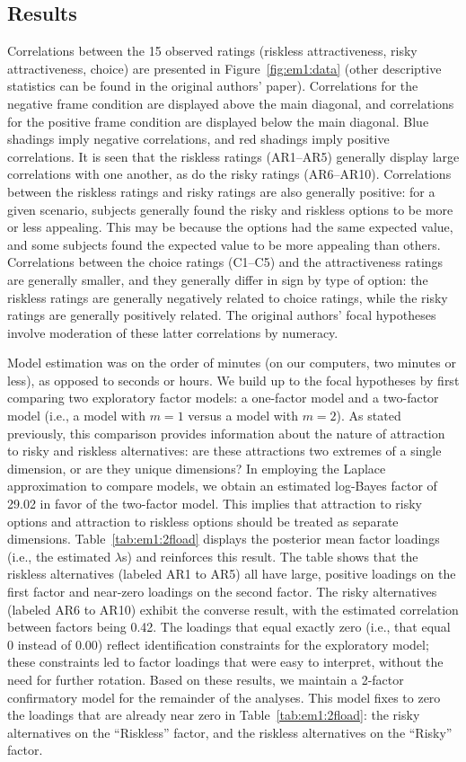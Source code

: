 \subsection{Results}
Correlations between the 15 observed ratings (riskless attractiveness, risky attractiveness, choice) are presented in Figure~\ref{fig:em1:data}  (other descriptive statistics can be found in the original authors' paper). Correlations for the negative frame condition are displayed above the main diagonal, and correlations for the positive frame condition are displayed below the main diagonal.  Blue shadings imply negative correlations, and red shadings imply positive correlations.  It is seen that the riskless ratings  (AR1--AR5) generally display large correlations with one another, as do the risky ratings (AR6--AR10).  Correlations between the riskless ratings and risky ratings are also generally positive: for a given scenario, subjects generally found the risky and riskless options to be more or less appealing.  This may be because the options had the same expected value, and some subjects found the expected value to be more appealing than others. Correlations between the choice ratings (C1--C5) and the attractiveness ratings are generally smaller, and they generally differ in sign by type of option: the riskless ratings are generally negatively related to choice ratings, while the risky ratings are generally positively related. The original authors' focal hypotheses involve moderation of these  latter correlations by numeracy.

Model estimation was on the order of minutes (on our computers, two minutes or less), as opposed to seconds or hours.     We build up to the focal hypotheses by first comparing two exploratory factor models: a one-factor model and a two-factor model (i.e., a model with $m=1$ versus a model with $m=2$).  As stated previously, this comparison provides information about the nature of attraction to risky and riskless alternatives: are these attractions two extremes of a single dimension, or are they unique dimensions?  In employing the Laplace approximation to compare models, we obtain an estimated log-Bayes factor of 29.02 in favor of the two-factor model.  This implies that attraction to risky options and attraction to riskless options should be treated as separate dimensions.  Table~\ref{tab:em1:2fload} displays the posterior mean factor loadings (i.e., the estimated $\lambda$s) and reinforces this result.  The table shows that the riskless alternatives (labeled AR1 to AR5) all have large, positive loadings on the first factor and near-zero loadings on the second factor.  The risky alternatives (labeled AR6 to AR10) exhibit the converse result, with the estimated correlation between factors being  0.42. The loadings that equal exactly zero (i.e., that equal 0 instead of $0.00$) reflect identification constraints for the exploratory model; these constraints led to factor loadings that were easy to interpret, without the need for further rotation. Based on these results, we maintain a 2-factor confirmatory model for the remainder of the analyses.  This model fixes to zero the loadings that are already near zero in Table~\ref{tab:em1:2fload}: the risky alternatives on the ``Riskless'' factor, and the riskless alternatives on the ``Risky'' factor.

